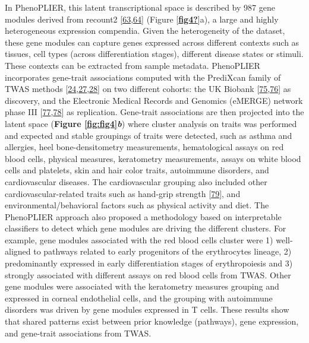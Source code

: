 In PhenoPLIER, this latent transcriptional space is described by 987 gene modules derived from recount2 {[}\protect\hyperlink{ref-14rnBunuZ}{63},\protect\hyperlink{ref-6SPTvFXq}{64}{]} (Figure {[}\protect\hyperlink{ref-fig4}{\textbf{fig4?}}{]}a), a large and highly heterogeneous expression compendia.
Given the heterogeneity of the dataset, these gene modules can capture genes expressed across different contexts such as tissues, cell types (across differentiation stages), different disease states or stimuli.
These contexts can be extracted from sample metadata.
PhenoPLIER incorporates gene-trait associations computed with the PrediXcan family of TWAS methods {[}\protect\hyperlink{ref-Z8bvDdVq}{24},\protect\hyperlink{ref-vLyTudUB}{27},\protect\hyperlink{ref-1FFzCXo1s}{28}{]} on two different cohorts: the UK Biobank {[}\protect\hyperlink{ref-nmJxPpE5}{75},\protect\hyperlink{ref-lY5ln3dB}{76}{]} as discovery, and the Electronic Medical Records and Genomics (eMERGE) network phase III {[}\protect\hyperlink{ref-wfqjCerX}{77},\protect\hyperlink{ref-gZAOkumx}{78}{]} as replication.
Gene-trait associations are then projected into the latent space (\textbf{Figure \ref{fig:fig4}\emph{b}}) where cluster analysis on traits was performed and expected and stable groupings of traits were detected, such as asthma and allergies, heel bone-densitometry measurements, hematological assays on red blood cells, physical measures, keratometry measurements, assays on white blood cells and platelets, skin and hair color traits, autoimmune disorders, and cardiovascular diseases.
The cardiovascular grouping also included other cardiovascular-related traits such as hand-grip strength {[}\protect\hyperlink{ref-WIZh9VF9}{79}{]}, and environmental/behavioral factors such as physical activity and diet.
The PhenoPLIER approach also proposed a methodology based on interpretable classifiers to detect which gene modules are driving the different clusters.
For example, gene modules associated with the red blood cells cluster were 1) well-aligned to pathways related to early progenitors of the erythrocytes lineage, 2) predominantly expressed in early differentiation stages of erythropoiesis and 3) strongly associated with different assays on red blood cells from TWAS.
Other gene modules were associated with the keratometry measures grouping and expressed in corneal endothelial cells, and the grouping with autoimmune disorders was driven by gene modules expressed in T cells.
These results show that shared patterns exist between prior knowledge (pathways), gene expression, and gene-trait associations from TWAS.

